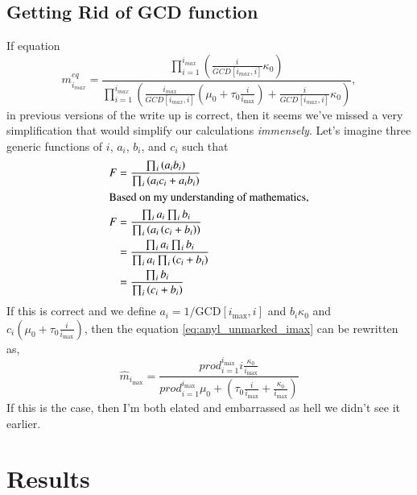 \documentclass[review]{elsarticle}
\newcommand{\imax}{\ensuremath{i_{\max}}\xspace}
\newcommand{\GCD}{\ensuremath{\text{GCD}}\xspace}
\begin{document}
\subsection*{Getting Rid of GCD function}
If equation
\begin{equation}\label{eq:anyl_unmarked_imax}
m_{i_{max}}^{eq}=\dfrac{\prod_{i=1}^{i_{max}}\left(\frac{i}{GCD[i_{max},i]}\kappa_0\right)}{\prod_{i=1}^{i_{max}}\left(\frac{i_{max}}{GCD[i_{max},i]}(\mu_0+\tau_0\frac{i}{\imax})+\frac{i}{GCD[i_{max},i]}\kappa_0\right)},
\end{equation}
 in previous versions of the write up is correct, then it seems we've missed a very simplification that would simplify our calculations \emph{immensely}.
Let's imagine three generic functions of $i$, $a_i$, $b_i$, and $c_i$ such that
\begin{align}
  F &= \frac{ \prod_i \left(a_i b_i\right)}{\prod_i \left(a_i c_i + a_i b_i\right)}\\
\intertext{Based on my understanding of mathematics,}
  F &= \frac{ \prod_i a_i \prod_i b_i }{\prod_i \left(a_i \left(c_i + b_i\right)\right)}\\
  &= \frac{ \prod_i a_i \prod_i b_i }{\prod_i a_i \prod_i \left(c_i + b_i\right)}\\
  &= \frac{\prod_i b_i }{\prod_i \left(c_i + b_i\right)}\\
\end{align}
If this is correct and we define $a_i = 1/\GCD[\imax, i]$ and $b_i \kappa_0$ and $c_i (\mu_0 + \tau_0\frac{i}{\imax})$, then the equation \ref{eq:anyl_unmarked_imax} can be rewritten as,
\begin{equation}
  \hat{m}_{\imax}= \frac{ prod_{i=1}^{\imax} i \frac{\kappa_0}{\imax}}{prod_{i=1}^{\imax} \mu_0 + \left(\tau_0\frac{i}{\imax} +\frac{\kappa_0}{\imax}\right)} 
\end{equation}
If this is the case, then I'm both elated and embarrassed as hell we didn't see it earlier.


\section{Results}

\end{document}
